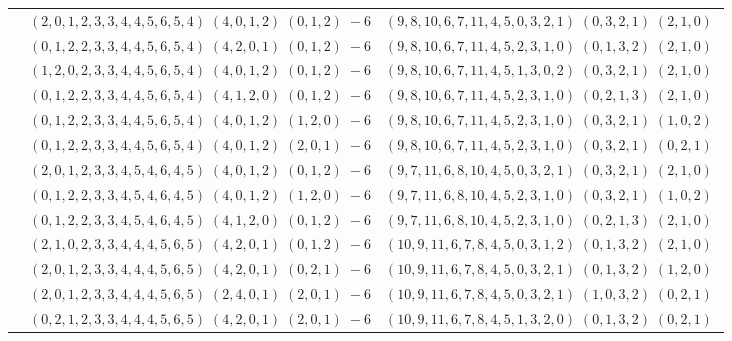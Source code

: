 \documentclass[11pt]{article}
\begin{document}
\begin{longtable}[l]{|c|c|c|}
 \cline{2-3} 
 & $(2 ,0 ,1 ,2 ,3 ,3 ,4 ,4 ,5 ,6 ,5 ,4) \;(4 ,0 ,1 ,2) \;(0 ,1 ,2) \;-6$ & $(9 ,8 ,10 ,6 ,7 ,11 ,4 ,5 ,0 ,3 ,2 ,1) \;(0 ,3 ,2 ,1) \;(2 ,1 ,0) \;$\\ 
 \cline{2-3} 
 & $(0 ,1 ,2 ,2 ,3 ,3 ,4 ,4 ,5 ,6 ,5 ,4) \;(4 ,2 ,0 ,1) \;(0 ,1 ,2) \;-6$ & $(9 ,8 ,10 ,6 ,7 ,11 ,4 ,5 ,2 ,3 ,1 ,0) \;(0 ,1 ,3 ,2) \;(2 ,1 ,0) \;$\\ 
 \cline{2-3} 
 & $(1 ,2 ,0 ,2 ,3 ,3 ,4 ,4 ,5 ,6 ,5 ,4) \;(4 ,0 ,1 ,2) \;(0 ,1 ,2) \;-6$ & $(9 ,8 ,10 ,6 ,7 ,11 ,4 ,5 ,1 ,3 ,0 ,2) \;(0 ,3 ,2 ,1) \;(2 ,1 ,0) \;$\\ 
 \cline{2-3} 
 & $(0 ,1 ,2 ,2 ,3 ,3 ,4 ,4 ,5 ,6 ,5 ,4) \;(4 ,1 ,2 ,0) \;(0 ,1 ,2) \;-6$ & $(9 ,8 ,10 ,6 ,7 ,11 ,4 ,5 ,2 ,3 ,1 ,0) \;(0 ,2 ,1 ,3) \;(2 ,1 ,0) \;$\\ 
 \cline{2-3} 
 & $(0 ,1 ,2 ,2 ,3 ,3 ,4 ,4 ,5 ,6 ,5 ,4) \;(4 ,0 ,1 ,2) \;(1 ,2 ,0) \;-6$ & $(9 ,8 ,10 ,6 ,7 ,11 ,4 ,5 ,2 ,3 ,1 ,0) \;(0 ,3 ,2 ,1) \;(1 ,0 ,2) \;$\\ 
 \cline{2-3} 
 & $(0 ,1 ,2 ,2 ,3 ,3 ,4 ,4 ,5 ,6 ,5 ,4) \;(4 ,0 ,1 ,2) \;(2 ,0 ,1) \;-6$ & $(9 ,8 ,10 ,6 ,7 ,11 ,4 ,5 ,2 ,3 ,1 ,0) \;(0 ,3 ,2 ,1) \;(0 ,2 ,1) \;$\\ 
 \cline{2-3} 
 & $(2 ,0 ,1 ,2 ,3 ,3 ,4 ,5 ,4 ,6 ,4 ,5) \;(4 ,0 ,1 ,2) \;(0 ,1 ,2) \;-6$ & $(9 ,7 ,11 ,6 ,8 ,10 ,4 ,5 ,0 ,3 ,2 ,1) \;(0 ,3 ,2 ,1) \;(2 ,1 ,0) \;$\\ 
 \cline{2-3} 
 & $(0 ,1 ,2 ,2 ,3 ,3 ,4 ,5 ,4 ,6 ,4 ,5) \;(4 ,0 ,1 ,2) \;(1 ,2 ,0) \;-6$ & $(9 ,7 ,11 ,6 ,8 ,10 ,4 ,5 ,2 ,3 ,1 ,0) \;(0 ,3 ,2 ,1) \;(1 ,0 ,2) \;$\\ 
 \cline{2-3} 
 & $(0 ,1 ,2 ,2 ,3 ,3 ,4 ,5 ,4 ,6 ,4 ,5) \;(4 ,1 ,2 ,0) \;(0 ,1 ,2) \;-6$ & $(9 ,7 ,11 ,6 ,8 ,10 ,4 ,5 ,2 ,3 ,1 ,0) \;(0 ,2 ,1 ,3) \;(2 ,1 ,0) \;$\\ 
 \cline{2-3} 
 & $(2 ,1 ,0 ,2 ,3 ,3 ,4 ,4 ,4 ,5 ,6 ,5) \;(4 ,2 ,0 ,1) \;(0 ,1 ,2) \;-6$ & $(10 ,9 ,11 ,6 ,7 ,8 ,4 ,5 ,0 ,3 ,1 ,2) \;(0 ,1 ,3 ,2) \;(2 ,1 ,0) \;$\\ 
 \cline{2-3} 
 & $(2 ,0 ,1 ,2 ,3 ,3 ,4 ,4 ,4 ,5 ,6 ,5) \;(4 ,2 ,0 ,1) \;(0 ,2 ,1) \;-6$ & $(10 ,9 ,11 ,6 ,7 ,8 ,4 ,5 ,0 ,3 ,2 ,1) \;(0 ,1 ,3 ,2) \;(1 ,2 ,0) \;$\\ 
 \cline{2-3} 
 & $(2 ,0 ,1 ,2 ,3 ,3 ,4 ,4 ,4 ,5 ,6 ,5) \;(2 ,4 ,0 ,1) \;(2 ,0 ,1) \;-6$ & $(10 ,9 ,11 ,6 ,7 ,8 ,4 ,5 ,0 ,3 ,2 ,1) \;(1 ,0 ,3 ,2) \;(0 ,2 ,1) \;$\\ 
 \cline{2-3} 
 & $(0 ,2 ,1 ,2 ,3 ,3 ,4 ,4 ,4 ,5 ,6 ,5) \;(4 ,2 ,0 ,1) \;(2 ,0 ,1) \;-6$ & $(10 ,9 ,11 ,6 ,7 ,8 ,4 ,5 ,1 ,3 ,2 ,0) \;(0 ,1 ,3 ,2) \;(0 ,2 ,1) \;$\\ 

\end{longtable}
\end{document}
